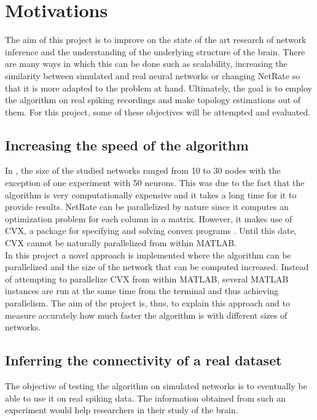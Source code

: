 \section{Motivations}

The aim of this project is to improve on the state of the art research of network inference and the understanding of the underlying structure of the brain. There are many ways in which this can be done such as scalability, increasing the similarity between simulated and real neural networks or changing NetRate so that it is more adapted to the problem at hand. Ultimately, the goal is to employ the algorithm on real spiking recordings and make topology estimations out of them. For this project, some of these objectives will be attempted and evaluated.

\subsection{Increasing the speed of the algorithm}

In \cite{alexandru2018estimating}, the size of the studied networks ranged from 10 to 30 nodes with the exception of one experiment with 50 neurons. This was due to the fact that the algorithm is very computationally expensive and it takes a long time for it to provide results. NetRate can be parallelized by nature since it computes an optimization problem for each column in a matrix. However, it makes use of CVX, a package for specifying and solving convex programs \cite{cvx,gb08}. Until this date, CVX cannot be naturally parallelized from within MATLAB. \\

In this project a novel approach is implemented where the algorithm can be parallelized and the size of the network that can be computed increased. Instead of attempting to parallelize CVX from within MATLAB, several MATLAB instances are run at the same time from the terminal and thus achieving parallelism. The aim of the project is, thus, to explain this approach and to measure accurately how much faster the algorithm is with different sizes of networks. 

\subsection{Inferring the connectivity of a real dataset}

The objective of testing the algorithm on simulated networks is to eventually be able to use it on real spiking data. The information obtained from such an experiment would help researchers in their study of the brain. 

